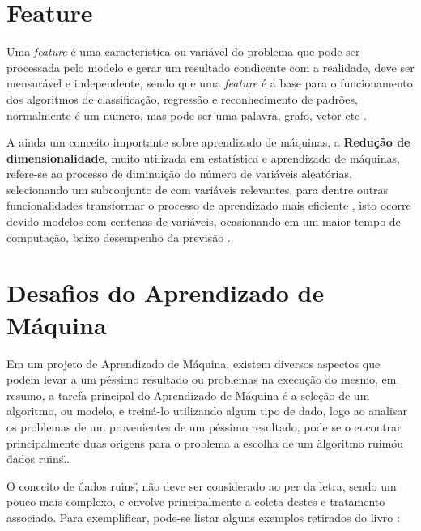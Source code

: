 \section{Feature}
Uma \textit{feature} é uma característica ou variável do problema que pode ser processada pelo modelo e gerar um resultado condicente com a realidade, deve ser mensurável e independente, sendo que uma \textit{feature} é a base para o funcionamento dos algoritmos de classificação, regressão e reconhecimento de padrões, normalmente é um numero, mas pode ser uma palavra, grafo, vetor etc \cite{chandrashekar2014survey}.

A ainda um conceito importante sobre aprendizado de máquinas, a \textbf{Redução de dimensionalidade}, muito utilizada em estatística e aprendizado de máquinas, refere-se ao processo de diminuição do número de variáveis aleatórias, selecionando um subconjunto de com variáveis relevantes, para dentre outras funcionalidades transformar o processo de aprendizado mais eficiente \cite{borges2006reduccao}, isto ocorre devido  modelos com centenas de variáveis, ocasionando em um maior tempo de computação, baixo desempenho da previsão \cite{chandrashekar2014survey}.

\section{Desafios do Aprendizado de Máquina}
Em um projeto de Aprendizado de Máquina, existem diversos aspectos que podem levar a um péssimo resultado ou problemas na execução do mesmo, em resumo, a tarefa principal do Aprendizado de Máquina é a seleção de um algoritmo, ou modelo, e treiná-lo utilizando algum tipo de dado, logo ao analisar os problemas de um provenientes de um péssimo resultado, pode se o encontrar principalmente duas origens para o problema a escolha de um \"algoritmo ruim\" ou  \"dados ruins\".\cite{geron2017hands}.

O conceito de \"dados ruins\", não deve ser considerado ao per da letra, sendo um pouco mais complexo, e envolve principalmente a coleta destes e tratamento associado. Para exemplificar,  pode-se listar alguns exemplos retirados do livro \cite{geron2017hands}:


